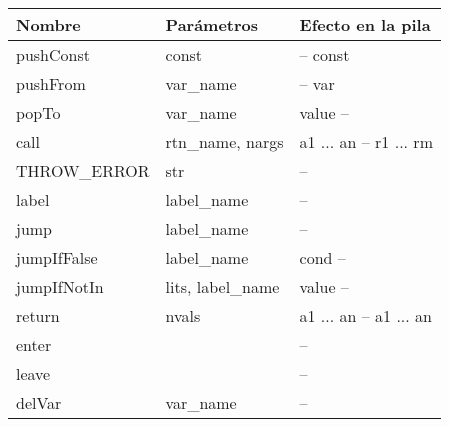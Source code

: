 \documentclass{article}
\begin{document}
\begin{tabular}{l|l|l}
\textbf{Nombre} & \textbf{Par\'ametros} & \textbf{Efecto en la pila}\\
\hline
pushConst   & const                       &           -- const\\
pushFrom     & var_name                    &           -- var\\
popTo      & var_name                    & value     --\\
call        & rtn_name, nargs             & a1 ... an -- r1 ... rm\\
THROW_ERROR        & str                         &           --\\
label       & label_name                  &           --\\
jump        & label_name                  &           --\\
jumpIfFalse & label_name                  &      cond --\\
jumpIfNotIn & lits, label_name            &     value --\\
return      & nvals                       & a1 ... an -- a1 ... an\\
enter                                   & & -- \\
leave                                   & & -- \\
delVar      & var_name                    & -- \\
\hline
\end{tabular}
\end{document}
